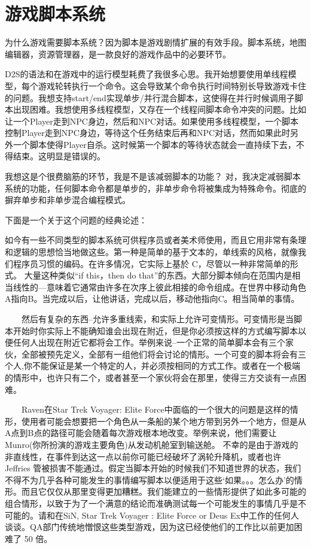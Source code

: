 \chapter{游戏脚本系统}
为什么游戏需要脚本系统？因为脚本是游戏剧情扩展的有效手段。脚本系统，地图编辑器，资源管理器，是一款良好的游戏作品中的必要环节。

D2S的语法和在游戏中的运行模型耗费了我很多心思。我开始想要使用单线程模型，每个游戏轮转执行一个命令。这会导致某个命令执行时间特别长导致游戏卡住的问题。我想支持start/end实现单步/并行混合脚本，这使得在并行时候调用子脚本出现困难。我想使用多线程模型，又存在一个线程间脚本命令冲突的问题。比如让一个Player走到NPC身边，然后和NPC对话。如果使用多线程模型，一个脚本控制Player走到NPC身边，等待这个任务结束后再和NPC对话，然而如果此时另外一个脚本使得Player自杀。这时候第一个脚本的等待状态就会一直持续下去，不得结束。这明显是错误的。

我想这是个很费脑筋的环节，我是不是该减弱脚本的功能？
对，我决定减弱脚本系统的功能，任何脚本命令都是单步的，非单步命令将被集成为特殊命令。彻底的摒弃单步和非单步混合编程模式。

下面是一个关于这个问题的经典论述：

如今有一些不同类型的脚本系统可供程序员或者美术师使用，而且它用非常有条理和逻辑的思想恰当地做这些。第一种是简单的基于文本的，单线索的风格，就像我们程序员习惯的编码。在许多情况，它实际上基於 C，尽管以一种非常简单的形式。 大量这种类似“if this，then do that”的东西。大部分脚本倾向在范围内是相当线性的—意味着它通常由许多在次序上彼此相接的命令组成。在世界中移动角色A指向B。当完成以后，让他讲话，完成以后，移动他指向C。相当简单的事情。

　　然后有复杂的东西--允许多重线索，和实际上允许可变情形。可变情形是当脚本开始时你实际上不能确知谁会出现在附近，但是你必须按这样的方式编写脚本以便任何人出现在附近它都将会工作。举例来说--一个正常的简单脚本会有三个家伙，全部被预先定义，全部有一组他们将会讨论的情形。一个可变的脚本将会有三个人,你不能保证是某一个特定的人，并必须按相同的方式工作。或者在一个极端的情形中，也许只有二个，或者甚至一个家伙将会在那里，使得三方交谈有一点困难。

　　Raven在Star Trek Voyager: Elite Force中面临的一个很大的问题是这样的情形，使用者可能会想要把一个角色从一条船的某个地方带到另外一个地方，但是从A点到B点的路径可能会随着每次游戏根本地改变。举例来说，他们需要让Munro(你所扮演的游戏主要角色)从发动机舱室到输送舱。 不幸的是由于游戏的非直线性，在事件到达这一点以前你可能已经破坏了涡轮升降机，或者也许 Jeffries 管被损害不能通过。假定当脚本开始的时候我们不知道世界的状态，我们不得不为几乎各种可能发生的事情编写脚本以便适用于这些‘如果。。。怎么办’的情形。而且它仅仅从那里变得更加糟糕。我们能建立的一些情形提供了如此多可能的组合情形，以致于为了一个满意的结论而准确测试每一个可能发生的事情几乎是不可能的。请和在SiN, Star Trek Voyager : Elite Force or Deus Ex中工作的任何人谈谈。QA部门传统地憎恨这些类型游戏，因为这已经使他们的工作比以前更加困难了 50 倍。

